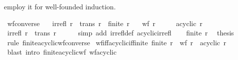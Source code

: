 \begin{isabellebody}
\begin{isamarkuptext}
  employ it for well-founded induction.%
\end{isamarkuptext}\isamarkuptrue%
\isamarkupfalse%
\ wf{\isacharunderscore}{\kern0pt}converse{\isacharcolon}{\kern0pt}\isanewline
\ \ \ {\isachardoublequoteopen}irrefl\ r{\isachardoublequoteclose}\ \ {\isachardoublequoteopen}trans\ r{\isachardoublequoteclose}\ \ {\isachardoublequoteopen}finite\ r{\isachardoublequoteclose}\isanewline
\ \ \ {\isachardoublequoteopen}wf\ {\isacharparenleft}{\kern0pt}r{\isasyminverse}{\isacharparenright}{\kern0pt}{\isachardoublequoteclose}\isanewline
%
\isadelimproof
%
\endisadelimproof
%
\isatagproof
{}\isamarkupfalse%
\ {\isacharminus}{\kern0pt}\isanewline
\ \ \isamarkupfalse%
\ {\isachardoublequoteopen}acyclic\ r{\isachardoublequoteclose}\isanewline
\ \ \ \ \isamarkupfalse%
\ {\isacartoucheopen}irrefl\ r{\isacartoucheclose}\ \ {\isacartoucheopen}trans\ r{\isacartoucheclose}\isanewline
\ \ \ \ \isamarkupfalse%
\ {\isacharparenleft}{\kern0pt}simp\ add{\isacharcolon}{\kern0pt}\ irrefl{\isacharunderscore}{\kern0pt}def\ acyclic{\isacharunderscore}{\kern0pt}irrefl{\isacharparenright}{\kern0pt}\isanewline
\ \ \isamarkupfalse%
\ {\isacartoucheopen}finite\ r{\isacartoucheclose}\ \isamarkupfalse%
\ {\isacharquery}{\kern0pt}thesis\isanewline
\ \ \ \ \isamarkupfalse%
\ {\isacharparenleft}{\kern0pt}rule\ finite{\isacharunderscore}{\kern0pt}acyclic{\isacharunderscore}{\kern0pt}wf{\isacharunderscore}{\kern0pt}converse{\isacharparenright}{\kern0pt}\isanewline
{}\isamarkupfalse%
%
\endisatagproof
{\isafoldproof}%
%
\isadelimproof
\isanewline
%
\endisadelimproof
\isanewline
{}\isamarkupfalse%
\ wf{\isacharunderscore}{\kern0pt}iff{\isacharunderscore}{\kern0pt}acyclic{\isacharunderscore}{\kern0pt}if{\isacharunderscore}{\kern0pt}finite{\isacharcolon}{\kern0pt}\ {\isachardoublequoteopen}finite\ r\ {\isasymLongrightarrow}\ wf\ r\ {\isacharequal}{\kern0pt}\ acyclic\ r{\isachardoublequoteclose}\isanewline
%
\isadelimproof
\ \ %
\endisadelimproof
%
\isatagproof
{}\isamarkupfalse%
\ {\isacharparenleft}{\kern0pt}blast\ intro{\isacharcolon}{\kern0pt}\ finite{\isacharunderscore}{\kern0pt}acyclic{\isacharunderscore}{\kern0pt}wf\ wf{\isacharunderscore}{\kern0pt}acyclic{\isacharparenright}{\kern0pt}%
\endisatagproof
{\isafoldproof}%
%
\isadelimproof
%
\endisadelimproof
%
\isadelimdocument
%
\endisadelimdocument
%
\isatagdocument

\end{isabellebody}
